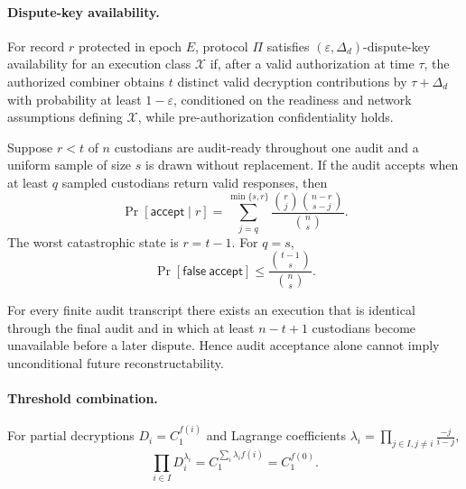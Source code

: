 
\newcommand{\DKA}{\mathsf{DKA}}
\newcommand{\AKR}{\mathsf{AKR}}
\newcommand{\DDL}{\mathsf{DDL}}
\newcommand{\PAC}{\mathsf{PAC}}
\newcommand{\Ready}{\mathsf{Ready}}

\paragraph{Dispute-key availability.}
For record $r$ protected in epoch $E$, protocol $\Pi$ satisfies
$(\varepsilon,\Delta_d)$-dispute-key availability for an execution class
$\mathcal{X}$ if, after a valid authorization at time $\tau$, the authorized
combiner obtains $t$ distinct valid decryption contributions by
$\tau+\Delta_d$ with probability at least $1-\varepsilon$, conditioned on the
readiness and network assumptions defining $\mathcal{X}$, while
pre-authorization confidentiality holds.

\begin{theorem}
Suppose $r<t$ of $n$ custodians are audit-ready throughout one audit and a
uniform sample of size $s$ is drawn without replacement. If the audit accepts
when at least $q$ sampled custodians return valid responses, then
\[
 \Pr[\mathsf{accept}\mid r]
 = \sum_{j=q}^{\min\{s,r\}}
   \frac{\binom{r}{j}\binom{n-r}{s-j}}{\binom{n}{s}}.
\]
The worst catastrophic state is $r=t-1$. For $q=s$,
\[
 \Pr[\mathsf{false\ accept}]
 \leq \frac{\binom{t-1}{s}}{\binom{n}{s}}.
\]
\end{theorem}

\begin{proposition}
For every finite audit transcript there exists an execution that is identical
through the final audit and in which at least $n-t+1$ custodians become
unavailable before a later dispute. Hence audit acceptance alone cannot imply
unconditional future reconstructability.
\end{proposition}

\paragraph{Threshold combination.}
For partial decryptions $D_i=C_1^{f(i)}$ and Lagrange coefficients
$\lambda_i=\prod_{j\in I,j\neq i}\frac{-j}{i-j}$,
\[
 \prod_{i\in I}D_i^{\lambda_i}
 = C_1^{\sum_i \lambda_i f(i)}
 = C_1^{f(0)}.
\]
